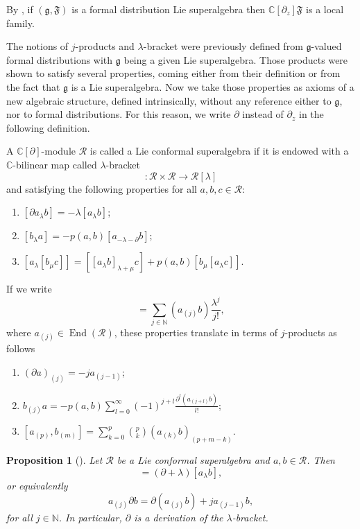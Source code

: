 \documentclass[a4paper, 12pt, reqno]{amsart}
\newtheorem{proposition}[theorem]{Proposition}
\theoremstyle{remark}
\numberwithin{equation}{subsection}
\DeclareMathOperator{\End}{End}
\begin{document}
By , if $(\mathfrak{g}, \mathfrak{F})$ is a formal distribution Lie superalgebra then $\mathbb{C}[\partial_z]\mathfrak{F}$ is a local family.

The notions of $j$-products and $\lambda$-bracket were previously defined from $\mathfrak{g}$-valued formal distributions with $\mathfrak{g}$ being a given Lie superalgebra.
Those products were shown to satisfy several properties, coming either from their definition or from the fact that $\mathfrak{g}$ is a Lie superalgebra.
Now we take those properties as axioms of a new algebraic structure, defined intrinsically, without any reference either to $\mathfrak{g}$, nor to formal distributions.
For this reason, we write $\partial$ instead of $\partial_z$ in the following definition.

A $\mathbb{C}[\partial]$-module $\mathcal{R}$ is called a Lie conformal superalgebra if it is endowed with a $\mathbb{C}$-bilinear map called $\lambda$-bracket
\begin{equation*}
  [\bullet_{\lambda}\bullet]: \mathcal{R}\times\mathcal{R} \to \mathcal{R}[\lambda]
\end{equation*}
and satisfying the following properties for all $a, b, c \in \mathcal{R}$:
\begin{enumerate}
\item $[\partial a_{\lambda}b] = -\lambda[a_{\lambda}b]$;
\item $[b_{\lambda}a] = -p(a, b)[a_{-\lambda - \partial}b]$;
\item $[a_{\lambda}[b_{\mu}c]] = [[a_{\lambda}b]_{\lambda +\mu}c] + p(a, b)[b_{\mu}[a_{\lambda}c]]$.
\end{enumerate}

If we write
\begin{equation*}
  [a_{\lambda}b] = \sum_{j \in \mathbb{N}}(a_{(j)}b)\frac{\lambda^j}{j!},
\end{equation*}
where $a_{(j)} \in \End(\mathcal{R})$, these properties translate in terms of $j$-products as follows
\begin{enumerate}[label = (\alph*)]
\item $(\partial a)_{(j)} = -j a_{(j - 1)}$; 
\item $b_{(j)}a = -p(a,b)\sum_{l = 0}^\infty(-1)^{j + l}\frac{\partial^l(a_{(j + l)}b)}{l!}$;
\item $[a_{(p)},b_{(m)}] = \sum_{k = 0}^p\binom{p}{k}(a_{(k)}b)_{(p + m - k)}$.
\end{enumerate}

\begin{proposition}[{\cite[Remark 2.5.3]{nozaradan_introduction_2008}}]
  \label{prp:3}
  Let $\mathcal{R}$ be a Lie conformal superalgebra and $a, b \in \mathcal{R}$.
  Then
  \begin{equation*}
    [a_{\lambda}\partial b] = (\partial + \lambda)[a_{\lambda}b],
  \end{equation*}
  or equivalently
  \begin{equation*}
    a_{(j)}\partial b = \partial(a_{(j)}b) + ja_{(j - 1)}b,
  \end{equation*}
  for all $j \in \mathbb{N}$.
  In particular, $\partial$ is a derivation of the $\lambda$-bracket.
\end{proposition}
\end{document}
